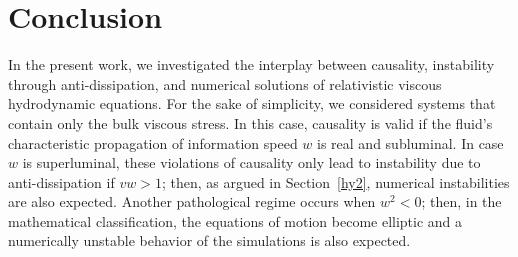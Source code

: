 \documentclass[aps, prd, showkeys,superscriptaddress, nofootinbib,floatfix]{revtex4-2}
\begin{document}



 






\section{Conclusion}
\label{sec:concl}

In the present work, we investigated the interplay between causality, instability through anti-dissipation, and numerical solutions of relativistic viscous hydrodynamic equations.
 For the sake of simplicity, we considered systems that contain only the bulk viscous stress. In this case, causality is valid if the fluid's characteristic propagation of information speed $w$ is real and subluminal. In case $w$ is superluminal, these violations of causality only lead to instability due to anti-dissipation if $vw > 1$; then, as argued in Section~\ref{hy2}, numerical instabilities are also expected. Another pathological regime occurs when $w^{2} < 0$; then, in the mathematical classification, the equations of motion become elliptic and a numerically unstable behavior of the simulations is also expected. 
 
\end{document}
